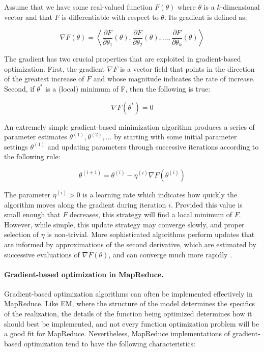 Assume that we have some real-valued function $F(\theta)$ where
$\theta$ is a $k$-dimensional vector and that $F$ is differentiable
with respect to $\theta$.  Its gradient is defined as:

\begin{equation}
\nabla F(\theta) = \left\langle \frac{\partial F}{\partial \theta_1}(\theta), \frac{\partial F}{\partial \theta_2}(\theta) , \ldots , \frac{\partial F}{\partial \theta_k}(\theta) \right\rangle
\end{equation}

\noindent The gradient has two crucial properties that are exploited
in gradient-based optimization.  First, the gradient $\nabla F$ is a
vector field that points in the direction of the greatest increase of
$F$ and whose magnitude indicates the rate of increase.  Second, if
$\theta^*$ is a (local) minimum of F, then the following is true:

\begin{equation}
\nabla F(\theta^*) = 0
\end{equation}

An extremely simple gradient-based minimization algorithm produces a
series of parameter estimates $\theta^{(1)}, \theta^{(2)}, \ldots$ by
starting with some initial parameter settings $\theta^{(1)}$ and
updating parameters through successive iterations according to the
following rule:

\begin{equation}
\theta^{(i+1)} = \theta^{(i)} - \eta^{(i)} \nabla F(\theta^{(i)})
\label{chapter6_eq_grad_opt1}
\end{equation}

\noindent The parameter $\eta^{(i)} > 0$ is a learning rate which
indicates how quickly the algorithm moves along the gradient during
iteration $i$.  Provided this value is small enough that $F$
decreases, this strategy will find a local minimum of $F$.  However,
while simple, this update strategy may converge slowly, and proper
selection of $\eta$ is non-trivial.  More sophisticated algorithms
perform updates that are informed by approximations of the second
derivative, which are estimated by successive evaluations of $\nabla
F(\theta)$, and can converge much more rapidly \cite{LBFGS}.

\paragraph{\textbf{Gradient-based optimization in MapReduce.}}
Gradient-based optimization algorithms can often be implemented
effectively in MapReduce.  Like EM, where the structure of the model
determines the specifics of the realization, the details of the
function being optimized determines how it should best be implemented,
and not every function optimization problem will be a good fit for
MapReduce.  Nevertheless, MapReduce implementations of gradient-based
optimization tend to have the following characteristics:

